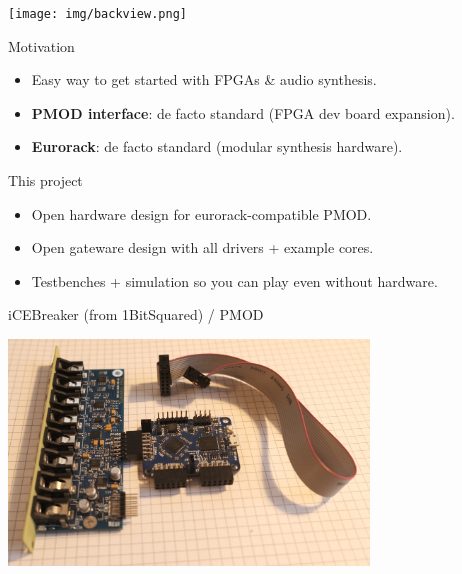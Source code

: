 \documentclass[aspectratio=169]{beamer}
\begin{document}
\begin{frame}{}
    \begin{center}
        \texttt{[image: img/backview.png]}
    \end{center}
    \begin{block}{Motivation}
        \begin{itemize}
            \item Easy way to get started with FPGAs \& audio synthesis.
            \item \textbf{PMOD interface}: de facto standard (FPGA dev board expansion).
            \item \textbf{Eurorack}: de facto standard (modular synthesis hardware).
        \end{itemize}
    \end{block}
    \begin{block}{This project}
        \begin{itemize}
            \item Open hardware design for eurorack-compatible PMOD.
            \item Open gateware design with all drivers + example cores.
            \item Testbenches + simulation so you can play even without hardware.
        \end{itemize}
    \end{block}
\end{frame}

\begin{frame}{iCEBreaker (from 1BitSquared) / PMOD}
    \begin{center}
        \includegraphics[height=6cm]{img/icebreaker.png}
    \end{center}
\end{frame}
\end{document}
